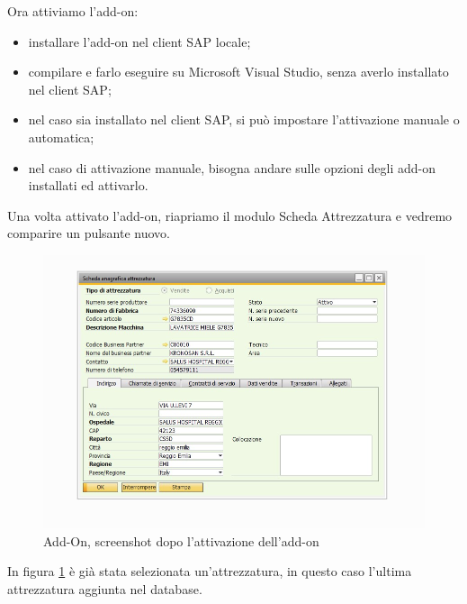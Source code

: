 \newpage

\begin{flushleft}
	Ora attiviamo l'add-on:
\end{flushleft}
\begin{itemize}
	\item installare l'add-on nel client SAP locale;
	\item compilare e farlo eseguire su Microsoft Visual Studio, senza averlo installato nel client SAP;
	\item nel caso sia installato nel client SAP, si può impostare l'attivazione manuale o automatica;
	\item nel caso di attivazione manuale, bisogna andare sulle opzioni degli add-on installati ed attivarlo.
\end{itemize} 
\begin{flushleft}
	
	Una volta attivato l'add-on, riapriamo il modulo Scheda Attrezzatura e vedremo comparire un pulsante nuovo.
	
\end{flushleft}
\begin{figure}[!h] 
	\centering 
	\includegraphics[scale = 0.6]{immagini/add-on/addon-scheda-yesbutton.jpg} 
	\caption{Add-On, screenshot dopo l'attivazione dell'add-on}
	\label{fig:4-5}
\end{figure}
\begin{flushleft}
	
	In figura \ref{fig:4-5} è già stata selezionata un'attrezzatura, in questo caso l'ultima attrezzatura aggiunta nel database.
	
\end{flushleft}

